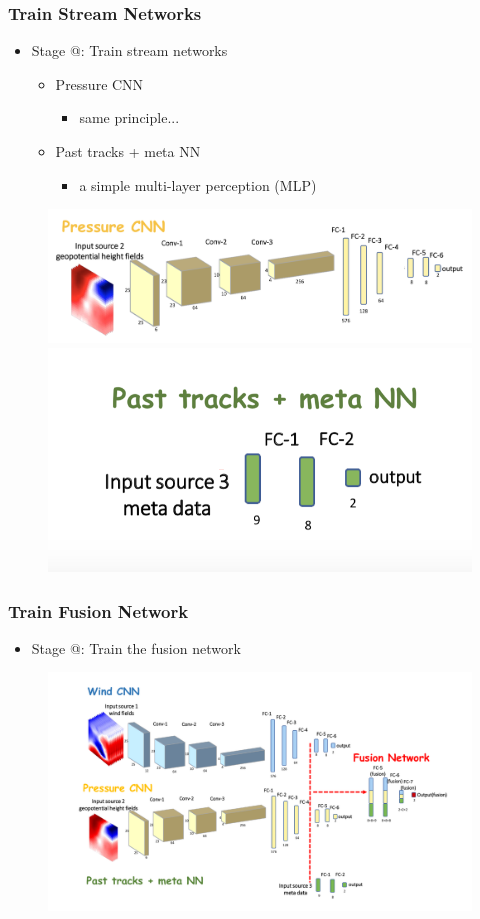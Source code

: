 \documentclass{beamer}
\makeatletter
\newcommand{\Rmnum}[1]{\expandafter\@slowromancap\romannumeral #1@}
\makeatother
\begin{document}
\begin{frame}
\frametitle{Train Stream Networks}
\begin{itemize}
	\item  Stage \Rmnum{1}: Train stream networks \\
	\begin{itemize}
		\item Pressure CNN
		\begin{itemize}
			\item same principle...
		\end{itemize}
		\item Past tracks + meta NN
			\begin{itemize}
				\item a simple multi-layer perception (MLP)
			\end{itemize}
	\end{itemize}
\end{itemize}
\begin{figure}

	\includegraphics[width=0.65\linewidth]{figs/pressure-cnn.png} \\
	\includegraphics[width=0.32\linewidth]{figs/meta-nn.png}
\end{figure}
\end{frame}



\begin{frame}
\frametitle{Train Fusion Network}
\begin{itemize}
	\item  Stage \Rmnum{2}: Train the fusion network \\
\end{itemize}
\begin{figure}
	
	\includegraphics[width=0.8\linewidth]{figs/fusion_network.pdf} \\
	
\end{figure}
\end{frame}
\end{document}
